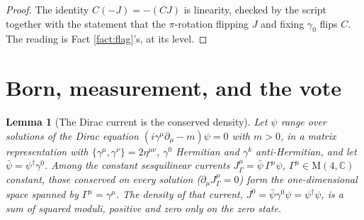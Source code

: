 \documentclass[11pt]{article}
\newtheorem{lemma}[theorem]{Lemma}
\theoremstyle{definition}
\newcommand{\C}{\mathbb{C}}
\newcommand{\Mat}{\mathrm{M}}
\begin{document}
\begin{proof}
The identity $C(-J) = -(CJ)$ is linearity, checked by the script together with the statement that the $\pi$-rotation flipping $J$ and fixing $\gamma_{0}$ flips $C$. The reading is Fact \ref{fact:flag}'s, at its level.
\end{proof}

\section{Born, measurement, and the vote}\label{sec:born}

\begin{lemma}[The Dirac current is the conserved density]\label{lem:current}
Let $\psi$ range over solutions of the Dirac equation $(i\gamma^{\mu}\partial_{\mu} - m)\psi = 0$ with $m > 0$, in a matrix representation with $\{\gamma^{\mu}, \gamma^{\nu}\} = 2\eta^{\mu\nu}$, $\gamma^{0}$ Hermitian and $\gamma^{k}$ anti-Hermitian, and let $\bar{\psi} = \psi^{\dagger}\gamma^{0}$. Among the constant sesquilinear currents $J^{\mu}_{\Gamma} = \bar{\psi}\,\Gamma^{\mu}\psi$, $\Gamma^{\mu} \in \Mat(4, \C)$ constant, those conserved on every solution ($\partial_{\mu}J^{\mu}_{\Gamma} = 0$) form the one-dimensional space spanned by $\Gamma^{\mu} = \gamma^{\mu}$. The density of that current, $J^{0} = \bar{\psi}\gamma^{0}\psi = \psi^{\dagger}\psi$, is a sum of squared moduli, positive and zero only on the zero state.
\end{lemma}
\end{document}
